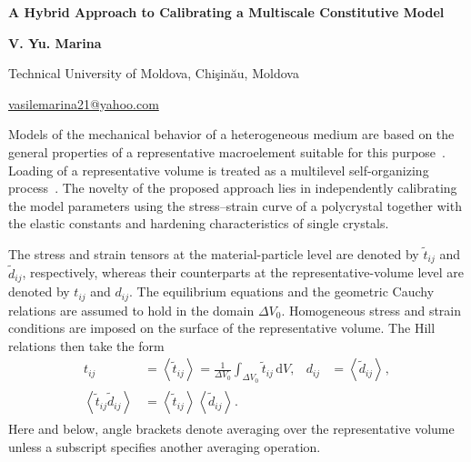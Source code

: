 \documentclass[11pt,a4paper]{article}
\numberwithin{equation}{section}
\newcommand{\avg}[2][]{\left\langle #2\right\rangle_{#1}}
\newcommand{\dd}{\,\mathrm{d}}
\begin{document}
\begin{center}
{\Large\bfseries A Hybrid Approach to Calibrating a Multiscale Constitutive Model\par}
\vspace{0.8em}
{\large\bfseries V. Yu. Marina\par}
\vspace{0.35em}
{Technical University of Moldova, Chi\c{s}in\u{a}u, Moldova\par}
\href{mailto:vasilemarina21@yahoo.com}{vasilemarina21@yahoo.com}
\end{center}

\vspace{0.8em}

Models of the mechanical behavior of a heterogeneous medium are based on the general properties of a representative macroelement suitable for this purpose~\cite{shevchenko1976,shevchenko1992,marina2024}. Loading of a representative volume is treated as a multilevel self-organizing process~\cite{marina2024,marina1997}. The novelty of the proposed approach lies in independently calibrating the model parameters using the stress--strain curve of a polycrystal together with the elastic constants and hardening characteristics of single crystals.

The stress and strain tensors at the material-particle level are denoted by $\widetilde t_{ij}$ and $\widetilde d_{ij}$, respectively, whereas their counterparts at the representative-volume level are denoted by $t_{ij}$ and $d_{ij}$. The equilibrium equations and the geometric Cauchy relations are assumed to hold in the domain $\Delta V_0$. Homogeneous stress and strain conditions are imposed on the surface of the representative volume. The Hill relations then take the form
\begin{equation}
\begin{aligned}
 t_{ij}&=\avg{\widetilde t_{ij}}
       =\frac{1}{\Delta V_0}\int_{\Delta V_0}\widetilde t_{ij}\dd V,
 & d_{ij}&=\avg{\widetilde d_{ij}},\\
 \avg{\widetilde t_{ij}\widetilde d_{ij}}
       &=\avg{\widetilde t_{ij}}\avg{\widetilde d_{ij}}.
\end{aligned}
\end{equation}
Here and below, angle brackets denote averaging over the representative volume unless a subscript specifies another averaging operation.
\end{document}
